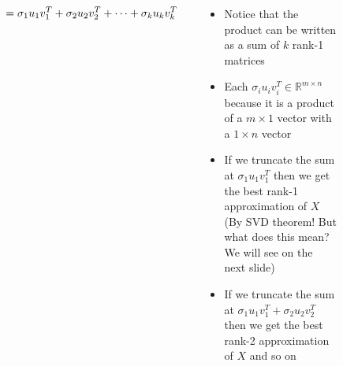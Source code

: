 \begin{frame}
\begin{columns}
\begin{overlayarea}{\textwidth}{\textheight}
{\begin{align*}
					\vspace{1cm}
					& \hspace{2cm}= \sigma_1 u_1 v_1^T + \sigma_2 u_2 v_2^T + \cdots + \sigma_k u_k v_k^T
				\end{align*}
			}
		\end{overlayarea}
		\begin{overlayarea}{\textwidth}{\textheight}
			\begin{itemize}\justifying
				\item<1-> Notice that the product can be written as a sum of $k$ rank-1 matrices
				\item<2-> Each $\sigma_i u_i v_i^T \in \mathbb{R}^{m\times n}$ because it is a product of a $m \times 1$ vector with a $1 \times n$ vector
				\item<3-> If we truncate the sum at $\sigma_1 u_1 v_1^T$ then we get the best rank-1 approximation of $X$ \onslide<4-> {(By SVD theorem! But what does this mean? We will see on the next slide)}
				\item<5-> If we truncate the sum at $\sigma_1 u_1 v_1^T + \sigma_2 u_2 v_2^T$ then we get the best rank-2 approximation of $X$ and so on
			\end{itemize}
		\end{overlayarea}
	\end{columns}
\end{frame}

